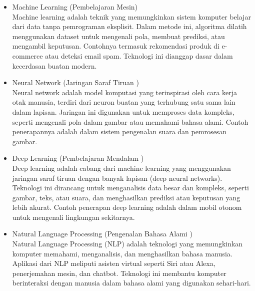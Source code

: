 \begin{subs}
\begin{itemize}
		\item Machine Learning (Pembelajaran Mesin) \\
		      Machine learning adalah teknik yang memungkinkan sistem komputer belajar dari data tanpa pemrograman eksplisit. Dalam metode ini, algoritma dilatih menggunakan dataset untuk mengenali pola, membuat prediksi, atau mengambil keputusan. Contohnya termasuk rekomendasi produk di e-commerce atau deteksi email spam. Teknologi ini dianggap dasar dalam kecerdasan buatan modern.
		\item Neural Network (Jaringan Saraf Tiruan ) \\
		      Neural network adalah model komputasi yang terinspirasi oleh cara kerja otak manusia, terdiri dari neuron buatan yang terhubung satu sama lain dalam lapisan. Jaringan ini digunakan untuk memproses data kompleks, seperti mengenali pola dalam gambar atau memahami bahasa alami. Contoh penerapannya adalah dalam sistem pengenalan suara dan pemrosesan gambar.
		\item Deep Learning (Pembelajaran Mendalam ) \\
		      Deep learning adalah cabang dari machine learning yang menggunakan jaringan saraf tiruan dengan banyak lapisan (deep neural networks). Teknologi ini dirancang untuk menganalisis data besar dan kompleks, seperti gambar, teks, atau suara, dan menghasilkan prediksi atau keputusan yang lebih akurat. Contoh penerapan deep learning adalah dalam mobil otonom untuk mengenali lingkungan sekitarnya.
		\item Natural Language Processing (Pengenalan Bahasa Alami ) \\
		      Natural Language Processing (NLP) adalah teknologi yang memungkinkan komputer memahami, menganalisis, dan menghasilkan bahasa manusia. Aplikasi dari NLP meliputi asisten virtual seperti Siri atau Alexa, penerjemahan mesin, dan chatbot. Teknologi ini membantu komputer berinteraksi dengan manusia dalam bahasa alami yang digunakan sehari-hari.
	\end{itemize}
\end{subs}

